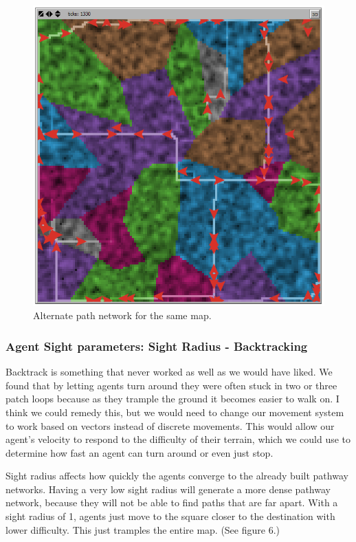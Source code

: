 \documentclass[conference]{IEEEtran}
\begin{document}
\begin{figure}[h]
\begin{center}
\includegraphics[scale=0.4]{image/results5}
\end{center}
\caption{Alternate path network for the same map.}
\end{figure}

\subsubsection{Agent Sight parameters: Sight Radius - Backtracking}
Backtrack is something that never worked as well as we would have liked. We found that by letting agents turn around they were often stuck in two or three patch loops because as they trample the ground it becomes easier to walk on. I think we could remedy this, but we would need to change our movement system to work based on vectors instead of discrete movements. This would allow our agent’s velocity to respond to the difficulty of their terrain, which we could use to determine how fast an agent can turn around or even just stop. 

Sight radius affects how quickly the agents converge to the already built pathway networks. Having a very low sight radius will generate a more dense pathway network, because they will not be able to find paths that are far apart. With a sight radius of 1, agents just move to the square closer to the destination with lower difficulty. This just tramples the entire map. (See figure 6.)
\end{document}
